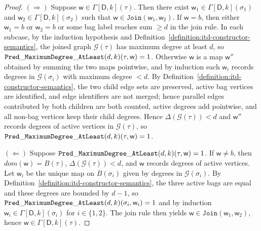 \documentclass[11pt,a4paper]{article}
\newcommand{\truevalue}{1}
\newcommand{\treewidthvalue}{k}
\newcommand{\decompositiongraph}[1]{\mathcal{G}(#1)}
\newcommand{\maxDegree}{\Delta}
\newcommand{\jointype}{\mathtt{Join}}
\newcommand{\topbagname}{B}
\newcommand{\topbag}[1]{\topbagname(#1)}
\newcommand{\abstractdecomposition}{\tau}
\newcommand{\sigmaabstractdecomposition}{\sigma}
\newcommand{\awitness}{\mathsf{w}}
\newcommand{\dpcore}{\mathsf{D}}
\newcommand{\dpNamePart}[1]{\mbox{\normalfont\ttfamily #1}}
\newcommand{\predicateMaxDegree}[2]{\dpNamePart{Pred}\_\allowbreak\dpNamePart{MaximumDegree}\_\allowbreak\dpNamePart{AtLeast}(#1,#2)}
\newcommand{\dynamizationfunctionname}[1]{\Gamma[{#1}]}
\newcommand{\dynamizationfunction}[2]{\dynamizationfunctionname{#1,#2}}
\newcommand{\domain}{dom}
\newcommand{\maxdegreeparameter}{d}
\newcommand{\maxdegreefound}{b}
\newcommand{\mxdp}{\predicateMaxDegree{\maxdegreeparameter}{\treewidthvalue}}
\begin{document}
{\begin{proof}
$(\Rightarrow)$ Suppose $\awitness\in \dynamizationfunction{\dpcore}{\treewidthvalue}(\abstractdecomposition)$. Then there exist $\awitness_1\in \dynamizationfunction{\dpcore}{\treewidthvalue}(\sigmaabstractdecomposition_1)$ and $\awitness_2\in \dynamizationfunction{\dpcore}{\treewidthvalue}(\sigmaabstractdecomposition_2)$ such that $\awitness\in \jointype(\awitness_1,\awitness_2)$. If $\awitness=\maxdegreefound$, then either $\awitness_1=\maxdegreefound$ or $\awitness_2=\maxdegreefound$ or some bag label reaches sum $\ge \maxdegreeparameter$ in the join rule. In each subcase, by the induction hypothesis and Definition~\ref{definition:itd-constructor-semantics}, the joined graph $\decompositiongraph{\abstractdecomposition}$ has maximum degree at least $\maxdegreeparameter$, so $\mxdp(\abstractdecomposition,\awitness)=\truevalue$. Otherwise $\awitness$ is a map $\awitness''$ obtained by summing the two maps pointwise, and by induction each $\awitness_i$ records degrees in $\decompositiongraph{\sigmaabstractdecomposition_i}$ with maximum degree $<\maxdegreeparameter$. By Definition~\ref{definition:itd-constructor-semantics}, the two child edge sets are preserved, active bag vertices are identified, and edge identifiers are not merged; hence parallel edges contributed by both children are both counted, active degrees add pointwise, and all non-bag vertices keep their child degrees. Hence $\maxDegree(\decompositiongraph{\abstractdecomposition})<\maxdegreeparameter$ and $\awitness''$ records degrees of active vertices in $\decompositiongraph{\abstractdecomposition}$, so $\mxdp(\abstractdecomposition,\awitness)=\truevalue$.

$(\Leftarrow)$ Suppose $\mxdp(\abstractdecomposition,\awitness)=\truevalue$. If $\awitness\neq \maxdegreefound$, then $\domain(\awitness)=\topbag{\abstractdecomposition}$, $\maxDegree(\decompositiongraph{\abstractdecomposition})<\maxdegreeparameter$, and $\awitness$ records degrees of active vertices. Let $\awitness_i$ be the unique map on $\topbag{\sigmaabstractdecomposition_i}$ given by degrees in $\decompositiongraph{\sigmaabstractdecomposition_i}$. By Definition~\ref{definition:itd-constructor-semantics}, the three active bags are equal and these degrees are bounded by $\maxdegreeparameter-1$, so $\mxdp(\sigmaabstractdecomposition_i,\awitness_i)=\truevalue$ and by induction $\awitness_i\in \dynamizationfunction{\dpcore}{\treewidthvalue}(\sigmaabstractdecomposition_i)$ for $i\in\{1,2\}$. The join rule then yields $\awitness\in \jointype(\awitness_1,\awitness_2)$, hence $\awitness\in \dynamizationfunction{\dpcore}{\treewidthvalue}(\abstractdecomposition)$.


\end{proof}}
\end{document}
